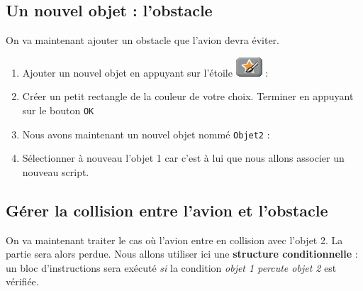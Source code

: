 \subsection{Un nouvel objet : l'obstacle}       

On va maintenant ajouter un obstacle que l'avion devra éviter.

\begin{enumerate}
\item Ajouter un nouvel objet en appuyant sur l'étoile \includegraphics[width=.7cm]{./images/scratch/EtoilePinceau} :
\item Créer un petit rectangle de la couleur de votre choix.
Terminer en appuyant sur le bouton \texttt{OK}
\item Nous avons maintenant un nouvel objet nommé \texttt{Objet2} :
\item Sélectionner à nouveau l'objet 1 car c'est à lui que nous allons associer un nouveau script.
\end{enumerate}


\subsection{Gérer la collision entre l'avion et l'obstacle} 

On va maintenant traiter le cas où l'avion entre en collision avec l'objet 2. La partie sera alors perdue. Nous allons utiliser ici une \textbf{structure conditionnelle} : un bloc d'instructions sera exécuté \emph{si} la condition \emph{objet 1 percute objet 2} est vérifiée. 

\vspace{12pt}


\vspace{12pt}





